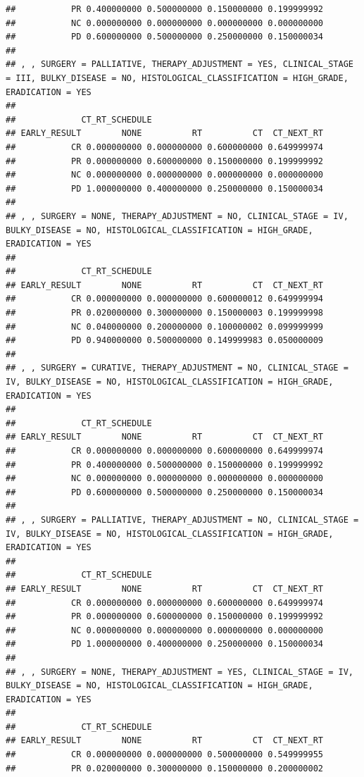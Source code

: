 \documentclass[]{article}
\begin{document}
\begin{verbatim}
##           PR 0.400000000 0.500000000 0.150000000 0.199999992
##           NC 0.000000000 0.000000000 0.000000000 0.000000000
##           PD 0.600000000 0.500000000 0.250000000 0.150000034
## 
## , , SURGERY = PALLIATIVE, THERAPY_ADJUSTMENT = YES, CLINICAL_STAGE = III, BULKY_DISEASE = NO, HISTOLOGICAL_CLASSIFICATION = HIGH_GRADE, ERADICATION = YES
## 
##             CT_RT_SCHEDULE
## EARLY_RESULT        NONE          RT          CT  CT_NEXT_RT
##           CR 0.000000000 0.000000000 0.600000000 0.649999974
##           PR 0.000000000 0.600000000 0.150000000 0.199999992
##           NC 0.000000000 0.000000000 0.000000000 0.000000000
##           PD 1.000000000 0.400000000 0.250000000 0.150000034
## 
## , , SURGERY = NONE, THERAPY_ADJUSTMENT = NO, CLINICAL_STAGE = IV, BULKY_DISEASE = NO, HISTOLOGICAL_CLASSIFICATION = HIGH_GRADE, ERADICATION = YES
## 
##             CT_RT_SCHEDULE
## EARLY_RESULT        NONE          RT          CT  CT_NEXT_RT
##           CR 0.000000000 0.000000000 0.600000012 0.649999994
##           PR 0.020000000 0.300000000 0.150000003 0.199999998
##           NC 0.040000000 0.200000000 0.100000002 0.099999999
##           PD 0.940000000 0.500000000 0.149999983 0.050000009
## 
## , , SURGERY = CURATIVE, THERAPY_ADJUSTMENT = NO, CLINICAL_STAGE = IV, BULKY_DISEASE = NO, HISTOLOGICAL_CLASSIFICATION = HIGH_GRADE, ERADICATION = YES
## 
##             CT_RT_SCHEDULE
## EARLY_RESULT        NONE          RT          CT  CT_NEXT_RT
##           CR 0.000000000 0.000000000 0.600000000 0.649999974
##           PR 0.400000000 0.500000000 0.150000000 0.199999992
##           NC 0.000000000 0.000000000 0.000000000 0.000000000
##           PD 0.600000000 0.500000000 0.250000000 0.150000034
## 
## , , SURGERY = PALLIATIVE, THERAPY_ADJUSTMENT = NO, CLINICAL_STAGE = IV, BULKY_DISEASE = NO, HISTOLOGICAL_CLASSIFICATION = HIGH_GRADE, ERADICATION = YES
## 
##             CT_RT_SCHEDULE
## EARLY_RESULT        NONE          RT          CT  CT_NEXT_RT
##           CR 0.000000000 0.000000000 0.600000000 0.649999974
##           PR 0.000000000 0.600000000 0.150000000 0.199999992
##           NC 0.000000000 0.000000000 0.000000000 0.000000000
##           PD 1.000000000 0.400000000 0.250000000 0.150000034
## 
## , , SURGERY = NONE, THERAPY_ADJUSTMENT = YES, CLINICAL_STAGE = IV, BULKY_DISEASE = NO, HISTOLOGICAL_CLASSIFICATION = HIGH_GRADE, ERADICATION = YES
## 
##             CT_RT_SCHEDULE
## EARLY_RESULT        NONE          RT          CT  CT_NEXT_RT
##           CR 0.000000000 0.000000000 0.500000000 0.549999955
##           PR 0.020000000 0.300000000 0.150000000 0.200000002

\end{verbatim}
\end{document}
